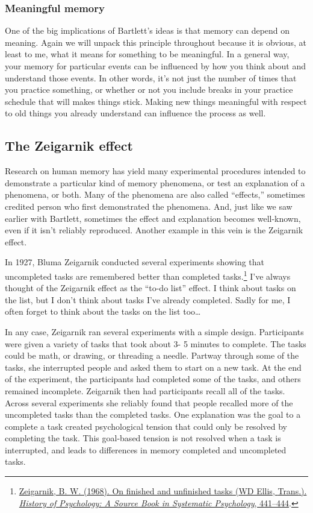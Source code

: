 \documentclass[
  oneside,
  12pt]{crumpbook}
\begin{document}
\hypertarget{meaningful-memory}{%
\subsubsection{Meaningful memory}\label{meaningful-memory}}

One of the big implications of Bartlett's ideas is that memory can depend on meaning. Again we will unpack this principle throughout because it is obvious, at least to me, what it means for something to be meaningful. In a general way, your memory for particular events can be influenced by how you think about and understand those events. In other words, it's not just the number of times that you practice something, or whether or not you include breaks in your practice schedule that will makes things stick. Making new things meaningful with respect to old things you already understand can influence the process as well.

\hypertarget{the-zeigarnik-effect}{%
\subsection{The Zeigarnik effect}\label{the-zeigarnik-effect}}

Research on human memory has yield many experimental procedures intended to demonstrate a particular kind of memory phenomena, or test an explanation of a phenomena, or both. Many of the phenomena are also called ``effects,'' sometimes credited person who first demonstrated the phenomena. And, just like we saw earlier with Bartlett, sometimes the effect and explanation becomes well-known, even if it isn't reliably reproduced. Another example in this vein is the Zeigarnik effect.

In 1927, Bluma Zeigarnik conducted several experiments showing that uncompleted tasks are remembered better than completed tasks.\footnote{\protect\hyperlink{ref-zeigarnikFinishedUnfinishedTasks1968}{Zeigarnik, B. W. (1968). On finished and unfinished tasks ({WD Ellis}, {Trans}.). \emph{History of Psychology: A Source Book in Systematic Psychology}, 441--444}.} I've always thought of the Zeigarnik effect as the ``to-do list'' effect. I think about tasks on the list, but I don't think about tasks I've already completed. Sadly for me, I often forget to think about the tasks on the list too\ldots{}

In any case, Zeigarnik ran several experiments with a simple design. Participants were given a variety of tasks that took about 3- 5 minutes to complete. The tasks could be math, or drawing, or threading a needle. Partway through some of the tasks, she interrupted people and asked them to start on a new task. At the end of the experiment, the participants had completed some of the tasks, and others remained incomplete. Zeigarnik then had participants recall all of the tasks. Across several experiments she reliably found that people recalled more of the uncompleted tasks than the completed tasks. One explanation was the goal to a complete a task created psychological tension that could only be resolved by completing the task. This goal-based tension is not resolved when a task is interrupted, and leads to differences in memory completed and uncompleted tasks.
\end{document}
